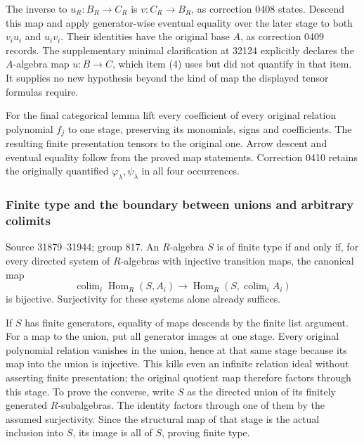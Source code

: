The inverse to \(u_R:B_R\to C_R\) is \(v:C_R\to B_R\), as correction 0408 states. Descend this map and apply generator-wise eventual equality over the later stage to both \(v_i u_i\) and \(u_i v_i\). Their identities have the original base \(A\), as correction 0409 records. The supplementary minimal clarification at 32124 explicitly declares the \(A\)-algebra map \(u:B\to C\), which item (4) uses but did not quantify in that item. It supplies no new hypothesis beyond the kind of map the displayed tensor formulas require.

For the final categorical lemma lift every coefficient of every original relation polynomial \(f_j\) to one stage, preserving its monomials, signs and coefficients. The resulting finite presentation tensors to the original one. Arrow descent and eventual equality follow from the proved map statements. Correction 0410 retains the originally quantified \(\varphi_\lambda,\psi_\lambda\) in all four occurrences.

\subsubsection{Finite type and the boundary between unions and arbitrary colimits}\label{finite-type-and-the-boundary-between-unions-and-arbitrary-colimits}

Source 31879--31944; group 817. An \(R\)-algebra \(S\) is of finite type if and only if, for every directed system of \(R\)-algebras with injective transition maps, the canonical map \[
\operatorname{colim}_i\operatorname{Hom}_R(S,A_i)
\longrightarrow\operatorname{Hom}_R(S,\operatorname{colim}_i A_i)
\] is bijective. Surjectivity for these systems alone already suffices.

If \(S\) has finite generators, equality of maps descends by the finite list argument. For a map to the union, put all generator images at one stage. Every original polynomial relation vanishes in the union, hence at that same stage because its map into the union is injective. This kills even an infinite relation ideal without asserting finite presentation; the original quotient map therefore factors through this stage. To prove the converse, write \(S\) as the directed union of its finitely generated \(R\)-subalgebras. The identity factors through one of them by the assumed surjectivity. Since the structural map of that stage is the actual inclusion into \(S\), its image is all of \(S\), proving finite type.

